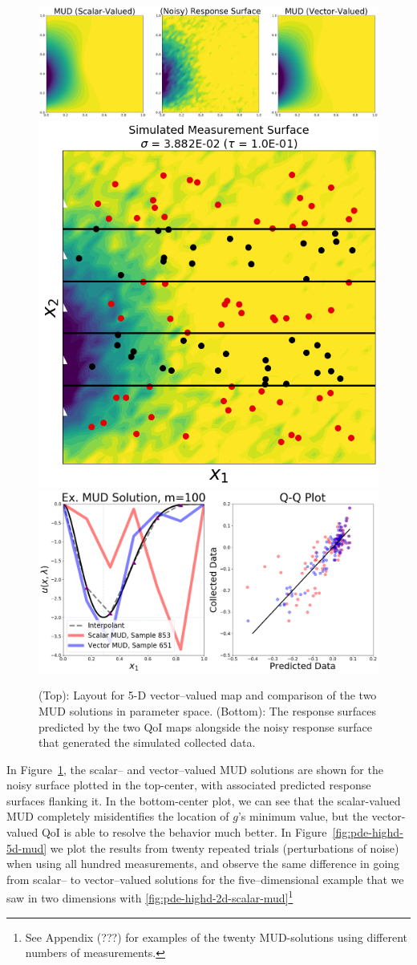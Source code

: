 \begin{figure}[htbp]
\centering
  \includegraphics[width=0.95\linewidth]{figures/pde-highd/pde-highd_surf_exmud_D5_m100}
  \includegraphics[width=0.35\linewidth]{figures/pde-highd/pde-highd_sensors_D5}
  \includegraphics[width=0.6\linewidth]{figures/pde-highd/pde-highd_comp_exmud_D5_m100}
\caption{
(Top): Layout for 5-D vector--valued map and comparison of the two MUD solutions in parameter space.
(Bottom): The response surfaces predicted by the two QoI maps alongside the noisy response surface that generated the simulated collected data.
}
\label{fig:pde-highd-5d-example}
\end{figure}

In Figure~\ref{fig:pde-highd-5d-example}, the scalar-- and vector--valued MUD solutions are shown for the noisy surface plotted in the top-center, with associated predicted response surfaces flanking it.
In the bottom-center plot, we can see that the scalar-valued MUD completely misidentifies the location of $g$'s minimum value, but the vector-valued QoI is able to resolve the behavior much better.
In Figure~\ref{fig:pde-highd-5d-mud} we plot the results from twenty repeated trials (perturbations of noise) when using all hundred measurements, and observe the same difference in going from scalar-- to vector--valued solutions for the five--dimensional example that we saw in two dimensions with \ref{fig:pde-highd-2d-scalar-mud}\footnote{See Appendix (???) for examples of the twenty MUD-solutions using different numbers of measurements.}

